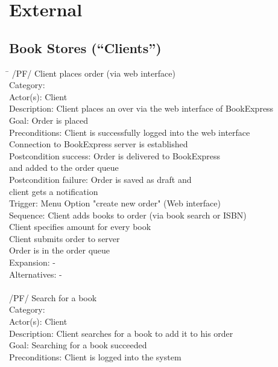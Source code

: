 \documentclass[11pt,a4paper,oneside,svgnames]{report}
\begin{document}
\section{External}
\subsection{Book Stores (``Clients'')}

\begin{tabbing}
\hspace{3cm}\=\kill
/PF/ \> Client places order (via web interface)\\ 
	 Category: \> \\
	 Actor(s): \> Client\\ 
	 Description: \> Client places an over via the web interface of BookExpress\\ 
	 Goal: \> Order is placed\\
	 Preconditions: \> Client is successfully logged into the web interface\\
	 \> Connection to BookExpress server is established\\
	 Postcondition success: \> Order is delivered to BookExpress\\
	 \> and added to the order queue\\
	 Postcondition failure: \> Order is saved as draft and\\
	 \> client gets a notification\\
	 Trigger: \> Menu Option "create new order" (Web interface)\\
	 Sequence: \> Client adds books to order (via book search or ISBN)\\
	 \> Client specifies amount for every book\\
	 \> Client submits order to server\\
	 \> Order is in the order queue\\
	 Expansion: \> -\\
	 Alternatives: \> -\\
	 \\
	 /PF/ \> Search for a book\\ 
	 Category: \> \\
	 Actor(s): \> Client\\ 
	 Description: \> Client searches for a book to add it to his order\\ 
	 Goal: \> Searching for a book succeeded\\
	 Preconditions: \> Client is logged into the system\\

\end{tabbing}
\end{document}
